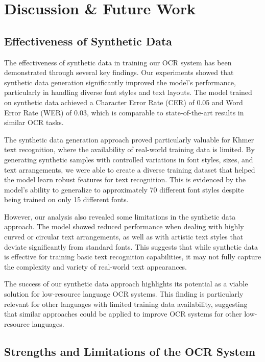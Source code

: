 \chapter{Discussion \& Future Work}
\label{ch:discussion}

\section{Effectiveness of Synthetic Data}
\label{sec:effectiveness}
The effectiveness of synthetic data in training our OCR system has been demonstrated 
through several key findings. Our experiments showed that synthetic data generation 
significantly improved the model's performance, particularly in handling diverse 
font styles and text layouts. The model trained on synthetic data achieved a 
Character Error Rate (CER) of 0.05 and Word Error Rate (WER) of 0.03, which is 
comparable to state-of-the-art results in similar OCR tasks.

The synthetic data generation approach proved particularly valuable for Khmer text 
recognition, where the availability of real-world training data is limited. 
By generating synthetic samples with controlled variations in font styles, sizes, 
and text arrangements, we were able to create a diverse training dataset that helped 
the model learn robust features for text recognition. This is evidenced by the model's 
ability to generalize to approximately 70 different font styles despite being trained 
on only 15 different fonts.

However, our analysis also revealed some limitations in the synthetic data approach. 
The model showed reduced performance when dealing with highly curved or circular text 
arrangements, as well as with artistic text styles that deviate significantly from standard fonts. 
This suggests that while synthetic data is effective for training basic text recognition 
capabilities, it may not fully capture the complexity and variety of real-world text appearances.

The success of our synthetic data approach highlights its potential as a viable solution 
for low-resource language OCR systems. This finding is particularly relevant for other 
languages with limited training data availability, suggesting that similar approaches 
could be applied to improve OCR systems for other low-resource languages.

\section{Strengths and Limitations of the OCR System}
\label{sec:strengths}

